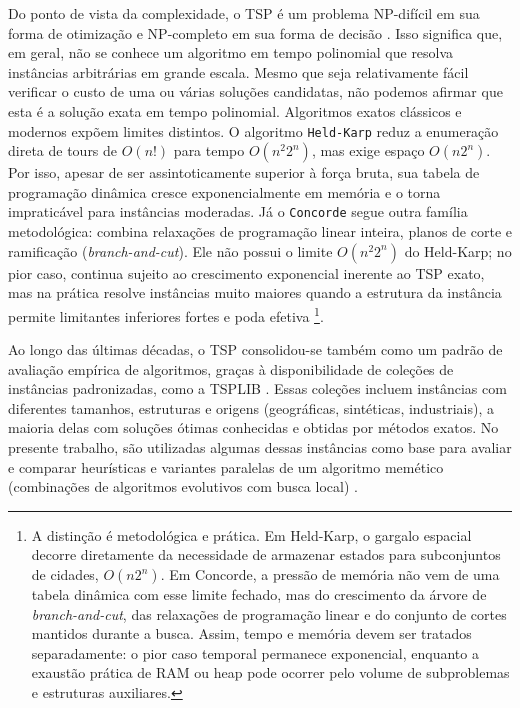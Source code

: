 Do ponto de vista da complexidade, o TSP é um problema NP-difícil em sua
forma de otimização e NP-completo em sua forma de decisão
\autocite{cook2012pursuit}. Isso significa que, em geral, não se conhece
um algoritmo em tempo polinomial que resolva instâncias arbitrárias em
grande escala. Mesmo que seja relativamente fácil verificar o custo de
uma ou várias soluções candidatas, não podemos afirmar que esta é a
solução exata em tempo polinomial. Algoritmos exatos clássicos e
modernos expõem limites distintos. O algoritmo \texttt{Held-Karp}
\autocite{held1962dynamic} reduz a enumeração direta de tours de
\(O(n!)\) para tempo \(O(n^2 2^n)\), mas exige espaço \(O(n 2^n)\). Por
isso, apesar de ser assintoticamente superior à força bruta, sua tabela
de programação dinâmica cresce exponencialmente em memória e o torna
impraticável para instâncias moderadas. Já o \texttt{Concorde}
\autocite{cook2012pursuit} segue outra família
metodológica: combina relaxações de programação linear inteira, planos
de corte e ramificação (\emph{branch-and-cut}). Ele não possui o limite
\(O(n^2 2^n)\) do Held-Karp; no pior caso, continua sujeito ao
crescimento exponencial inerente ao TSP exato, mas na prática resolve
instâncias muito maiores quando a estrutura da instância permite
limitantes inferiores fortes e poda efetiva \footnote{A distinção é
  metodológica e prática. Em Held-Karp, o gargalo espacial decorre
  diretamente da necessidade de armazenar estados para subconjuntos de
  cidades, \(O(n 2^n)\). Em Concorde, a pressão de memória não vem de
  uma tabela dinâmica com esse limite fechado, mas do crescimento da
  árvore de \emph{branch-and-cut}, das relaxações de programação linear
  e do conjunto de cortes mantidos durante a busca. Assim, tempo e
  memória devem ser tratados separadamente: o pior caso temporal
  permanece exponencial, enquanto a exaustão prática de RAM ou heap pode
  ocorrer pelo volume de subproblemas e estruturas auxiliares.
}.

Ao longo das últimas décadas, o TSP consolidou-se também como um padrão
de avaliação empírica de algoritmos, graças à disponibilidade de
coleções de instâncias padronizadas, como a TSPLIB
\autocite{reinelt1991tsplib}. Essas coleções incluem instâncias com
diferentes tamanhos, estruturas e origens (geográficas, sintéticas,
industriais), a maioria delas com soluções ótimas conhecidas e obtidas
por métodos exatos. No presente trabalho, são utilizadas algumas dessas
instâncias como base para avaliar e comparar heurísticas e variantes
paralelas de um algoritmo memético (combinações de algoritmos evolutivos
com busca local) \autocite{larranaga1999genetic,fujimoto2011highly}.

